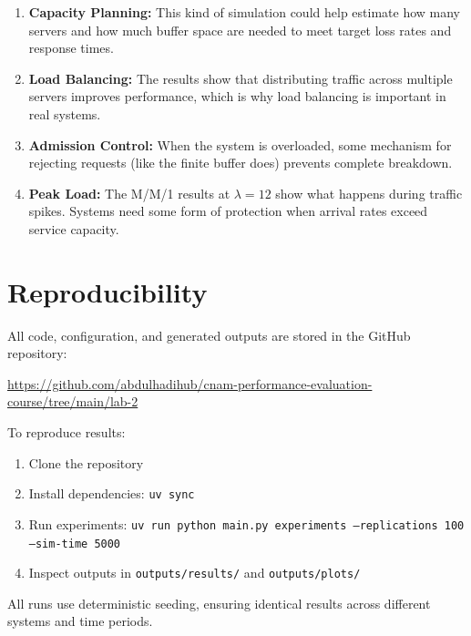 \documentclass[12pt]{article}
\begin{document}
\begin{enumerate}
    \item \textbf{Capacity Planning:} This kind of simulation could help estimate how many servers and how much buffer space are needed to meet target loss rates and response times.

    \item \textbf{Load Balancing:} The results show that distributing traffic across multiple servers improves performance, which is why load balancing is important in real systems.

    \item \textbf{Admission Control:} When the system is overloaded, some mechanism for rejecting requests (like the finite buffer does) prevents complete breakdown.

    \item \textbf{Peak Load:} The M/M/1 results at $\lambda = 12$ show what happens during traffic spikes. Systems need some form of protection when arrival rates exceed service capacity.
\end{enumerate}

\section{Reproducibility}

All code, configuration, and generated outputs are stored in the GitHub repository:

\begin{center}
    \url{https://github.com/abdulhadihub/cnam-performance-evaluation-course/tree/main/lab-2}
\end{center}

To reproduce results:

\begin{enumerate}
    \item Clone the repository
    \item Install dependencies: \texttt{uv sync}
    \item Run experiments: \texttt{uv run python main.py experiments --replications 100 --sim-time 5000}
    \item Inspect outputs in \texttt{outputs/results/} and \texttt{outputs/plots/}
\end{enumerate}

All runs use deterministic seeding, ensuring identical results across different systems and time periods.
\end{document}
